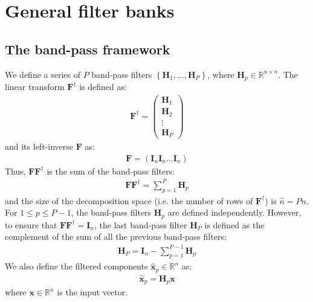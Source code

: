 \documentclass[12pt]{scrartcl}
\begin{document}
\section{General filter banks}

\subsection{The band-pass framework}
We define a series of $P$ band-pass filters $\left\{\mathbf{H}_1,\dots,\mathbf{H}_P\right\}$, where $\mathbf{H}_p \in \mathbb{R}^{n \times n}$. The linear transform $\mathbf{F}^\dag$ is defined as:
\begin{align}
\mathbf{F}^\dag = \left( \begin{array}{c}
\mathbf{H}_1 \\
\mathbf{H}_2 \\
\vdots \\
\mathbf{H}_P
\end{array}
\right)
\end{align}
and its left-inverse $\mathbf{F}$ as:
\begin{align}
\mathbf{F} = \left(\mathbf{I}_n \mathbf{I}_n \dots \mathbf{I}_n\right)
\end{align}
Thus, $\mathbf{F} \mathbf{F}^\dag$ is the sum of the band-pass filters:
\begin{align}
\mathbf{F} \mathbf{F}^\dag = \sum_{p=1}^P \mathbf{H}_p
\end{align}
and the size of the decomposition space (i.e. the number of rows of $\mathbf{F}^\dag$) is $\widehat{n} = Pn$. For $1 \le p \le P-1$, the band-pass filters $\mathbf{H}_p$ are defined independently. However, to ensure that $\mathbf{F} \mathbf{F}^\dag = \mathbf{I}_n$, the last band-pass filter $\mathbf{H}_P$ is defined as the complement of the sum of all the previous band-pass filters:
\begin{align}
\label{eq:bp1}
\mathbf{H}_P = \mathbf{I}_n - \sum_{p=1}^{P-1} \mathbf{H}_p
\end{align}
We also define the filtered components $\widehat{\mathbf{x}}_p \in \mathbb{R}^n$ as:
\begin{align}
\label{eq:bp2}
\widehat{\mathbf{x}}_p = \mathbf{H}_p \mathbf{x}
\end{align}
where $\mathbf{x} \in \mathbb{R}^n$ is the input vector.
\end{document}
